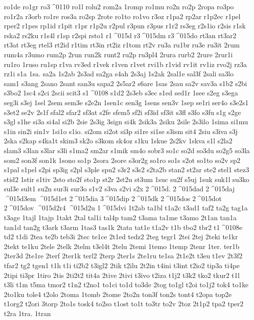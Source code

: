 {ro1de
ro1gr
ro3^^^^0110
ro1l
rolu2
rom2a
1romp
ro1mu
ro2n
ro2p
2ropa
ro3po
ro1r2a
r3orb
ro1re
ros3a
ro2sp
2rote
ro1to
ro1vo
r3oz
r1pa2
rp2ar
r1p2ec
r1pel
rper2
r1pes
rp1id
r1pit
r1pr
r1p2u
r2pul
r3pun
r3pus
r1r2
rs3eg
r2s1io
r2sis
r1sk
rska2
rs2ku
r1s4l
r1sp
r2spi
rsto1
r1^^^^015d
r3^^^^015dm
r3^^^^015do
rt3an
rt3ar2
rt3at
rt3eg
rtel3
rt2id
r1tim
rt3in
rt2iz
r1tom
rt2v
ru3a
ru1br
ru3e
ru3it
2rum
rum4a
r3umo
rum2p
2run
run2k
runt2
ru2p
ru3pl4
2rura
rurb2
2rure
2rur1i
ru1ro
1ruso
ru1sp
r1va
rv3ed
r1vek
r1ven
r1vet
rvi1b
r1vid
rv1it
rv1iz
rvo2j
rz3a
rz1i
s1a
1sa.
sa2a
1s2ab
2s3ad
sa2ga
s4ah
2s3aj
1s2ak
2sal1e
sal3f
2sali
sa3lo
sam1
s3ang
2sano
2sant
san3u
sapa2
2s5ar2
s6are
1sas
2sau
sa2v
sav3a
s1b2
s2bi
s3bo2
1sc4
s2ci
2scii
scit3
s1^^^^0108
s1d2
2s3eb
s3ec
s1ed
sed1r
1see
s2eg
s3ega
seg3i
s3ej
1sel
2sem
sem3e
s2e2n
1sen1c
sen3g
1sens
sen3v
1sep
se1ri
ser4o
s3e2s1
s3et2
se2v
2s1f
sfal2
sfar2
sf3at
s2fe
sfem5
sf2i
sf3id
sf3it
s3fl
s3fo
s3fu
s1g
s2ge
s3gl
s1he
si3a
si4al
si2b
2sie
2s3ig
3sign
si4k
2sik3a
2siku
2sile
2s3ilo
1sima
si1mu
s1in
sin2i
sin1v
1si1o
s1io.
si2om
si2ot
si3p
si1re
si1se
s3ism
sit4
2siu
s3iva
s3j
2ska
s2kap
s4ka1t
skim3
sk2o
s3kom
sk4oz
s1ku
1skue
2s2kv
1skva
s1l
s2la2
slam3
s3lan
s3lar
s3li
s1ma2
sm2ar
s1mik
sm4o
sobr3
so1c
so2d
so3du
so2g5
so3la
som2
son3f
son1k
1sono
so1p
2sora
2sore
s3or2g
so1ro
so1s
s2ot
so1to
so2v
sp2
s1pal
s1pel
s2pi
sp3ig
s2pl
s3ple
spu2
s3r2
s3s2
s2ta2b
stan2
st2ar
ste2
stel1
stez3
stid2
1stir
s1tiv
2sto
sto2f
sto1p
st2r
2st2u
st3um
1suc
su2f
s5uj
1suk
suk1l
su3ko
sul3e
sult1
su2n
sur3i
sur3o
s1v2
s3va
s2vi
s2x
2^^^^015d.
2^^^^015dad
2^^^^015daj
^^^^015d3em
^^^^015d1et
2^^^^015dia
3^^^^015dip
2^^^^015dk
2^^^^015dos
2^^^^015dot
2^^^^015dov
^^^^015d2r4
^^^^015d2u
1^^^^015dvi
1t2ab
ta1bl
t1a2c
t3ad1
taf2
ta2g
tag1a
t3age
1tajl
1tajp
1takt
2tal
tal1i
tal4p
tam2
t3ama
ta1me
t3amo
2t1an
tan1a
tan1d
tan2g
t3ark
t3arm
1tas3
tas1k
2tata
tat1e
t1a2v
t1b
tbo2
tbr2
t1^^^^0108e
td2
t1di
2tea
te2b
teb3i
2tec
te1ce
2t1ed
tedz2
2teg
tegr1
2tei
2tej
2teki
te1kr
2tekt
te1ku
2tele
2telk
2telm
t3el4t
2telu
2temi
1temo
1temp
2tenr
1ter.
ter1b
2ter3d
2te1re
2terf
2ter1k
terl2
2terp
2ter1s
2te1ru
te1sa
2t1e2t
t3eu
t1ev
2t3f2
tfar2
tg2
tgen1
t1h
t1i
ti2b2
t3igl2
2tik
t2ilu
2t2in
t4ini
t3int
t2io2
tip3a
ti4pe
2tipi
ti3pr
1tiro
2tis
2ti2t2
tit4a
2tive
2tivi
t3ivo
t2iza
t1j2
t3k2
tko2
tkur2
t1l
t3li
t1m
t5ma
tmor2
t1n2
t2no1
to1ci
to1d
to3de
2tog
to1gl
t2oi
to1j2
tok4
to1ke
2to1ku
tole4
t2olo
2toma
1tomb
2tome
2to2n
ton3f
ton2s
tont4
t2opa
top2e
t1org2
t2ori
3torp
2to1s
tosk4
to2so
t1ost
to1t
to3tr
to2v
2toz
2t1p2
tpa2
tper2
t2ra
1tra.
1tran
}
